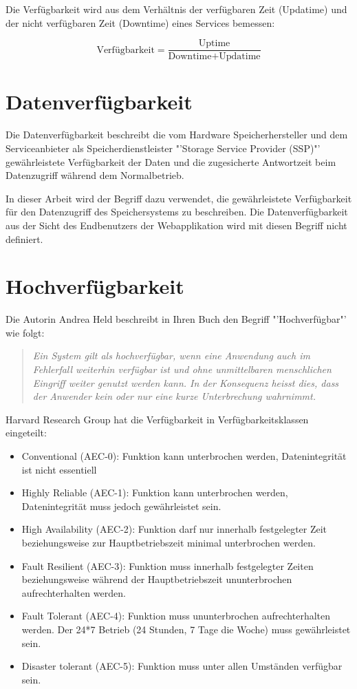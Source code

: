 Die Verfügbarkeit wird aus dem Verhältnis der verfügbaren Zeit (Updatime) und der nicht verfügbaren Zeit (Downtime) eines Services \cite{Held2004} bemessen:

\begin{equation}
\mbox{Verfügbarkeit} = \frac{\mbox{Uptime}}{ \mbox{Downtime} + \mbox{Updatime} }
\label{eqn:Verfügbarkeit}
\end{equation}

\section{Datenverfügbarkeit}
Die Datenverfügbarkeit beschreibt die vom Hardware Speicherhersteller und dem Serviceanbieter als Speicherdienstleister "'Storage Service Provider (SSP)"' gewährleistete Verfügbarkeit der Daten und die zugesicherte Antwortzeit beim Datenzugriff während dem Normalbetrieb. \cite{TechTarget2001}

In dieser Arbeit wird der Begriff dazu verwendet, die gewährleistete Verfügbarkeit für den Datenzugriff des Speichersystems zu beschreiben. Die Datenverfügbarkeit aus der Sicht des Endbenutzers der Webapplikation wird mit diesen Begriff nicht definiert. 

\section{Hochverfügbarkeit}
Die Autorin Andrea Held beschreibt in Ihren Buch den Begriff "'Hochverfügbar"' wie folgt:
\begin{quotation}\em
Ein System gilt als hochverfügbar, wenn eine Anwendung auch im Fehlerfall weiterhin verfügbar ist und ohne unmittelbaren menschlichen Eingriff weiter genutzt werden kann. In der Konsequenz heisst dies, dass der Anwender kein oder nur eine kurze Unterbrechung wahrnimmt.\end{quotation}\cite{Held2004}

Harvard Research Group hat die Verfügbarkeit in Verfügbarkeitsklassen eingeteilt:

\begin{itemize}
\item Conventional (AEC-0): Funktion kann unterbrochen werden, Datenintegrität ist nicht essentiell
\item Highly Reliable (AEC-1): Funktion kann unterbrochen werden, Datenintegrität muss jedoch gewährleistet sein.
\item High Availability (AEC-2): Funktion darf nur innerhalb festgelegter Zeit beziehungsweise zur Hauptbetriebszeit minimal unterbrochen werden.
\item Fault Resilient (AEC-3): Funktion muss innerhalb festgelegter Zeiten beziehungsweise während der Hauptbetriebszeit ununterbrochen aufrechterhalten werden.
\item Fault Tolerant (AEC-4): Funktion muss ununterbrochen aufrechterhalten werden. Der 24*7 Betrieb (24 Stunden, 7 Tage die Woche) muss gewährleistet sein.
\item Disaster tolerant (AEC-5): Funktion muss unter allen Umständen verfügbar sein.
\end{itemize}
\cite{Held2004}

